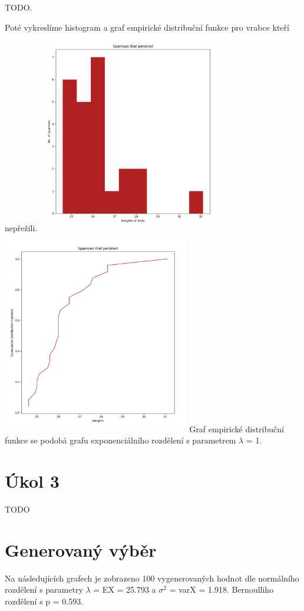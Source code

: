 \documentclass[12pt,a4paper]{article}
\begin{document}
TODO.\par \bigskip

Poté vykreslíme histogram a graf empirické distribuční funkce pro vrabce kteří nepřežili.
\includegraphics[height=3.5in]{diedHist}
\includegraphics[height=3.5in]{diedDist}
Graf empirické distribuční funkce se podobá grafu exponenciálního rozdělení s parametrem $\lambda$ = 1.\par \bigskip

\section{Úkol 3}
TODO

\section{Generovaný výběr}
Na následujících grafech je zobrazeno 100 vygenerovaných hodnot dle normálního rozdělení s parametry $\lambda$ = EX = 25.793 a $\sigma ^2$ = varX = 1.918. Bernoulliho rozdělení s p = 0.593.
\end{document}
